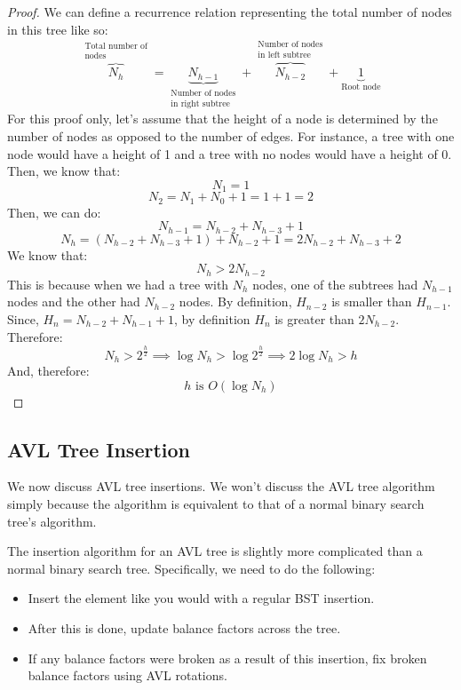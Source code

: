 \documentclass[letterpaper]{article}
\begin{document}
\begin{mdframed}
\begin{proof}
    We can define a recurrence relation representing the total number of nodes in this tree like so: 
    \[\overbrace{N_h}^{\substack{\text{Total number of} \\ \text{nodes}}} = \underbrace{N_{h - 1}}_{\substack{\text{Number of nodes} \\ \text{in right subtree}}} + \overbrace{N_{h - 2}}^{\substack{\text{Number of nodes} \\ \text{in left subtree}}} + \underbrace{1}_{\text{Root node}}\]
    For this proof only, let's assume that the height of a node is determined by the number of nodes as opposed to the number of edges. For instance, a tree with one node would have a height of 1 and a tree with no nodes would have a height of 0. Then, we know that: 
    \[N_1 = 1\]
    \[N_2 = N_1 + N_0 + 1 = 1 + 1 = 2\]
    Then, we can do: 
    \[N_{h - 1} = N_{h - 2} + N_{h - 3} + 1\]
    \[N_h = (N_{h - 2} + N_{h - 3} + 1) + N_{h - 2} + 1 = 2N_{h - 2} + N_{h - 3} + 2\]
    We know that: 
    \[N_h > 2N_{h - 2}\]
    This is because when we had a tree with $N_h$ nodes, one of the subtrees had $N_{h - 1}$ nodes and the other had $N_{h - 2}$ nodes. By definition, $H_{n - 2}$ is smaller than $H_{n - 1}$. Since, $H_n = N_{h - 2} + N_{h - 1} + 1$, by definition $H_n$ is greater than $2N_{h - 2}$. Therefore: 
    \[N_h > 2^{\frac{h}{2}} \implies \log N_h > \log 2^{\frac{h}{2}} \implies 2\log N_h > h\]
    And, therefore: 
    \[\boxed{h \text{ is } O(\log N_h)}\]
    \end{proof}
\end{mdframed}

\subsection{AVL Tree Insertion}
We now discuss AVL tree insertions. We won't discuss the AVL tree  algorithm simply because the  algorithm is equivalent to that of a normal binary search tree's  algorithm. 

\bigskip 

The insertion algorithm for an AVL tree is slightly more complicated than a normal binary search tree. Specifically, we need to do the following: 
\begin{itemize}
    \item Insert the element like you would with a regular BST insertion. 
    \item After this is done, update balance factors across the tree. 
    \item If any balance factors were broken as a result of this insertion, fix broken balance factors using AVL rotations. 
\end{itemize}
\end{document}
